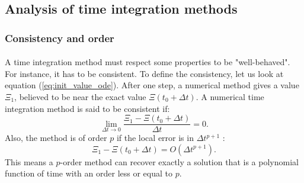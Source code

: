     \subsection{Analysis of time integration methods}

      \subsubsection{Consistency and order}

        \paragraph{}
        A time integration method must respect some properties to be "well-behaved".
        For instance, it has to be consistent.
        To define the consistency, let us look at equation (\ref{eq:init_value_ode}).
        After one step, a numerical method gives a value $\Xi_1$, believed to be near the exact value $\Xi\left(t_0 + \Delta t\right)$.
        A numerical time integration method is said to be consistent if:
        \begin{equation}
          \lim_{\Delta t \rightarrow 0} \frac{\Xi_1 - \Xi\left(t_0 + \Delta t\right)}{\Delta t} = 0 .
        \end{equation}
        Also, the method is of order $p$ if the local error is in $\Delta t^{p+1}$ \cite{Iserles2008}:
        \begin{equation}
          \Xi_1 - \Xi\left(t_0 + \Delta t\right) = O\left(\Delta t^{p+1}\right) .
        \end{equation}
        This means a $p$-order method can recover exactly a solution that is a polynomial function of time with an order less or equal to $p$.

